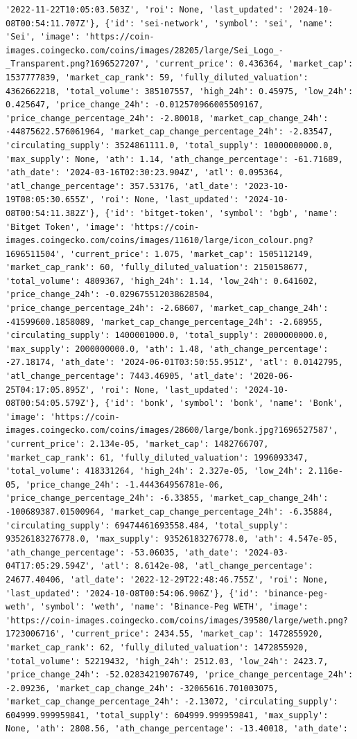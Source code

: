 \documentclass[
  letterpaper,
  DIV=11,
  numbers=noendperiod]{scrreprt}
\begin{document}
\begin{verbatim}
'2022-11-22T10:05:03.503Z', 'roi': None, 'last_updated': '2024-10-08T00:54:11.707Z'}, {'id': 'sei-network', 'symbol': 'sei', 'name': 'Sei', 'image': 'https://coin-images.coingecko.com/coins/images/28205/large/Sei_Logo_-_Transparent.png?1696527207', 'current_price': 0.436364, 'market_cap': 1537777839, 'market_cap_rank': 59, 'fully_diluted_valuation': 4362662218, 'total_volume': 385107557, 'high_24h': 0.45975, 'low_24h': 0.425647, 'price_change_24h': -0.012570966005509167, 'price_change_percentage_24h': -2.80018, 'market_cap_change_24h': -44875622.576061964, 'market_cap_change_percentage_24h': -2.83547, 'circulating_supply': 3524861111.0, 'total_supply': 10000000000.0, 'max_supply': None, 'ath': 1.14, 'ath_change_percentage': -61.71689, 'ath_date': '2024-03-16T02:30:23.904Z', 'atl': 0.095364, 'atl_change_percentage': 357.53176, 'atl_date': '2023-10-19T08:05:30.655Z', 'roi': None, 'last_updated': '2024-10-08T00:54:11.382Z'}, {'id': 'bitget-token', 'symbol': 'bgb', 'name': 'Bitget Token', 'image': 'https://coin-images.coingecko.com/coins/images/11610/large/icon_colour.png?1696511504', 'current_price': 1.075, 'market_cap': 1505112149, 'market_cap_rank': 60, 'fully_diluted_valuation': 2150158677, 'total_volume': 4809367, 'high_24h': 1.14, 'low_24h': 0.641602, 'price_change_24h': -0.029675512038628504, 'price_change_percentage_24h': -2.68607, 'market_cap_change_24h': -41599600.1858089, 'market_cap_change_percentage_24h': -2.68955, 'circulating_supply': 1400001000.0, 'total_supply': 2000000000.0, 'max_supply': 2000000000.0, 'ath': 1.48, 'ath_change_percentage': -27.18174, 'ath_date': '2024-06-01T03:50:55.951Z', 'atl': 0.0142795, 'atl_change_percentage': 7443.46905, 'atl_date': '2020-06-25T04:17:05.895Z', 'roi': None, 'last_updated': '2024-10-08T00:54:05.579Z'}, {'id': 'bonk', 'symbol': 'bonk', 'name': 'Bonk', 'image': 'https://coin-images.coingecko.com/coins/images/28600/large/bonk.jpg?1696527587', 'current_price': 2.134e-05, 'market_cap': 1482766707, 'market_cap_rank': 61, 'fully_diluted_valuation': 1996093347, 'total_volume': 418331264, 'high_24h': 2.327e-05, 'low_24h': 2.116e-05, 'price_change_24h': -1.444364956781e-06, 'price_change_percentage_24h': -6.33855, 'market_cap_change_24h': -100689387.01500964, 'market_cap_change_percentage_24h': -6.35884, 'circulating_supply': 69474461693558.484, 'total_supply': 93526183276778.0, 'max_supply': 93526183276778.0, 'ath': 4.547e-05, 'ath_change_percentage': -53.06035, 'ath_date': '2024-03-04T17:05:29.594Z', 'atl': 8.6142e-08, 'atl_change_percentage': 24677.40406, 'atl_date': '2022-12-29T22:48:46.755Z', 'roi': None, 'last_updated': '2024-10-08T00:54:06.906Z'}, {'id': 'binance-peg-weth', 'symbol': 'weth', 'name': 'Binance-Peg WETH', 'image': 'https://coin-images.coingecko.com/coins/images/39580/large/weth.png?1723006716', 'current_price': 2434.55, 'market_cap': 1472855920, 'market_cap_rank': 62, 'fully_diluted_valuation': 1472855920, 'total_volume': 52219432, 'high_24h': 2512.03, 'low_24h': 2423.7, 'price_change_24h': -52.02834219076749, 'price_change_percentage_24h': -2.09236, 'market_cap_change_24h': -32065616.701003075, 'market_cap_change_percentage_24h': -2.13072, 'circulating_supply': 604999.999959841, 'total_supply': 604999.999959841, 'max_supply': None, 'ath': 2808.56, 'ath_change_percentage': -13.40018, 'ath_date': 
\end{verbatim}
\end{document}
